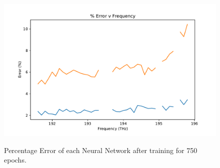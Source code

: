 
\begin{figure}
    \centering
    \caption{Percentage Error of each Neural Network after training for 750 epochs.}
    \includegraphics[width=\textwidth]{project/img/ml_model/comb_t_v_pct_err.pdf}
    \label{fig:ml_model:disc_train_val}
\end{figure}